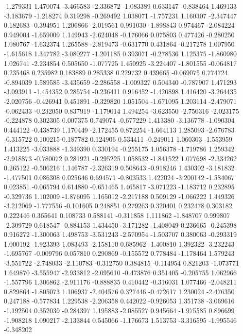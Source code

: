 -1.279331
1.470074
-3.466583
-2.336872
-1.083389
0.633147
-0.838464
1.469133
-3.183679
-1.218274
0.319298
-0.269492
1.038071
-1.757231
1.160307
-2.347447
0.182683
-0.394951
1.206866
-2.019561
0.991030
-1.898843
0.974467
-2.084224
0.949004
-1.659009
1.149943
-2.624048
-0.176066
0.075803
0.477426
-0.280250
1.080767
-1.632374
1.265588
-2.819473
-0.631770
0.431864
-0.217278
1.007950
-1.615618
1.347782
-3.080277
-1.201185
0.393071
-0.278536
1.125375
-1.860980
1.026741
-2.234854
0.505650
-1.077725
1.450925
-3.224407
-1.801555
-0.064817
0.235468
0.235982
0.183889
0.285338
0.229732
0.439665
-0.069075
0.774724
-0.894039
1.589585
-3.435659
-2.286558
-1.009327
0.504340
-0.787907
1.471293
-3.093911
-1.454352
0.285754
-0.236411
0.916452
-1.420898
1.416420
-3.264435
-2.020756
-0.426941
0.451891
-0.329820
1.051504
-1.671095
1.203114
-2.479071
-0.062433
-0.232050
0.837919
-1.179014
1.494254
-3.623550
-2.750316
-2.023175
-0.224878
0.302305
0.007375
0.749074
-0.677229
1.413380
-3.136778
-1.090304
0.444122
-0.438739
1.170449
-2.172455
0.872254
-1.664113
1.285093
-2.676783
-0.315722
0.100215
0.187782
0.124906
0.534411
-0.249011
1.060303
-1.553959
1.413225
-3.033888
-1.349390
0.330194
-0.255175
1.056378
-1.719786
1.259342
-2.918873
-0.780072
0.281921
-0.295225
1.058532
-1.841522
1.077698
-2.334262
0.265122
-0.506216
1.146787
-2.326319
0.508643
-0.918246
1.430302
-3.181832
-1.477501
0.086308
0.025646
0.694571
-0.803533
1.422024
-3.200142
-1.584067
0.023851
-0.065794
0.614880
-0.651465
1.465817
-3.071223
-1.183712
0.232895
-0.329736
1.102009
-1.876095
1.165012
-2.217188
0.509129
-1.066222
1.449326
-3.212069
-1.777556
-0.101605
0.248851
0.279263
0.320401
0.232478
0.303182
0.222446
0.365641
0.108733
0.588141
-0.311858
1.111862
-1.848707
0.999807
-2.309729
0.618547
-0.884153
1.434450
-3.171282
-1.408049
0.236665
-0.245398
0.916272
-1.300063
1.498753
-3.531243
-2.570954
-1.503707
0.380063
-0.293319
1.000192
-1.923393
1.083493
-2.158110
0.685962
-1.400810
1.392322
-3.232243
-1.695767
-0.009796
0.057810
0.290869
-0.155572
0.778484
-1.178464
1.579243
-3.551722
-2.748033
-2.110783
-0.312750
0.384815
-0.114954
0.821203
-1.073771
1.649870
-3.555947
-2.933812
-2.095610
-0.473876
0.351405
-0.205755
1.062966
-1.557796
1.306862
-2.911176
-0.888835
0.410442
-0.316031
1.077466
-2.048211
0.829864
-1.805073
1.106937
-2.404576
0.327446
-0.472617
1.230024
-2.476350
0.247188
-0.577834
1.229538
-2.206358
0.442022
-0.926053
1.351738
-3.069616
-1.192504
0.352039
-0.284397
1.195883
-2.085527
0.945664
-1.975585
0.896699
-1.908218
1.090217
-2.133844
0.545066
-1.176673
1.513753
-3.316595
-1.995546
-0.348202
